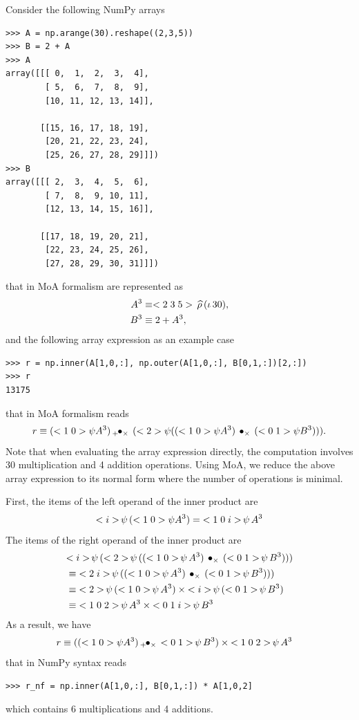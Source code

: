 \documentclass[a4paper,12pt]{article}
\begin{document}
Consider the following NumPy arrays
\begin{verbatim}
>>> A = np.arange(30).reshape((2,3,5))
>>> B = 2 + A
>>> A
array([[[ 0,  1,  2,  3,  4],
        [ 5,  6,  7,  8,  9],
        [10, 11, 12, 13, 14]],

       [[15, 16, 17, 18, 19],
        [20, 21, 22, 23, 24],
        [25, 26, 27, 28, 29]]])
>>> B
array([[[ 2,  3,  4,  5,  6],
        [ 7,  8,  9, 10, 11],
        [12, 13, 14, 15, 16]],

       [[17, 18, 19, 20, 21],
        [22, 23, 24, 25, 26],
        [27, 28, 29, 30, 31]]])
\end{verbatim}
that in MoA formalism are represented as
\begin{align}
  A^3 &\equiv \vccc235\reshape(\range30), \\
  B^3 &\equiv 2+A^3,
\end{align}
and the following array expression as an example case
\begin{verbatim}
>>> r = np.inner(A[1,0,:], np.outer(A[1,0,:], B[0,1,:])[2,:])
>>> r
13175
\end{verbatim}
that in MoA formalism reads
\begin{equation}
r \equiv (\vcc10\psi A^3) \innerprod+\times (\vc2\psi((\vcc10\psi A^3) \outerprod\times (\vcc01\psi B^3))).
\end{equation}
Note that when evaluating the array expression directly, the
computation involves 30 multiplication and 4 addition
operations. Using MoA, we reduce the above array expression to its
normal form where the number of operations is minimal.

First, the items of the left operand of the inner product are
\begin{align*}
  \getitem{(\vcc10\psi A^3)}{\vc i} = \getitem{A^3}{\vccc10i}
\end{align*}
The items of the right operand of the inner product are
\begin{align}
&\getitem{
  (\getitem{((\getitem{A^3}{\vcc10}) \outerprod\times (\getitem{B^3}{\vcc01}))}{\vc2})
}{\vc i} \\
&\equiv \getitem{((\getitem{A^3}{\vcc10}) \outerprod\times (\getitem{B^3}{\vcc01})))}{\vcc2i} \\
&\equiv \getitem{(\getitem{A^3}{\vcc10})}{\vc2} \times \getitem{(\getitem{B^3}{\vcc01})}{\vc i}\\
&\equiv \getitem{A^3}{\vccc102} \times \getitem{B^3}{\vccc01i}
\end{align}
As a result, we have
\begin{align*}
  r &\equiv ((\vcc10\psi A^3) \innerprod+\times  \getitem{B^3}{\vcc01})\times\getitem{A^3}{\vccc102}
\end{align*}
that in NumPy syntax reads
\begin{verbatim}
>>> r_nf = np.inner(A[1,0,:], B[0,1,:]) * A[1,0,2]
\end{verbatim}
which contains 6 multiplications and 4 additions.
\end{document}

